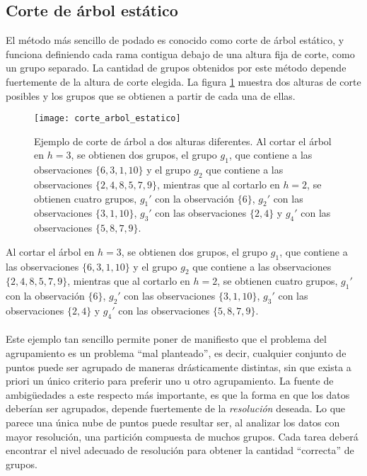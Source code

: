 \subsection{Corte de árbol estático}
El método más sencillo de podado es conocido como corte de árbol estático, y funciona definiendo cada rama contigua debajo de una altura fija de corte, como un grupo separado. La cantidad de grupos obtenidos por este método depende fuertemente de la altura de  corte elegida. La figura \ref{fig:corte_arbol_estatico} muestra dos alturas de corte posibles y los grupos que se obtienen a partir de cada una de ellas.
\begin{figure}[h]
    \centering
    \texttt{[image: corte\_arbol\_estatico]}
    \caption{Ejemplo de corte de árbol a dos alturas diferentes. Al cortar el árbol en $h=3$, se obtienen dos grupos, el grupo $g_1$, que contiene a las observaciones $\{6, 3, 1, 10\}$ y el grupo $g_2$ que contiene a las observaciones $\{2, 4, 8, 5, 7, 9\}$, mientras que al cortarlo en $h=2$, se obtienen cuatro grupos, $g_1'$ con la observación $\{6\}$, $g_2'$ con las observaciones $\{3, 1, 10\}$, $g_3'$ con las observaciones $\{2, 4\}$ y $g_4'$ con las observaciones $\{5, 8, 7, 9\}$.}
    \label{fig:corte_arbol_estatico}
\end{figure}
Al cortar el árbol en $h=3$, se obtienen dos grupos, el grupo $g_1$, que contiene a las observaciones $\{6, 3, 1, 10\}$ y el grupo $g_2$ que contiene a las observaciones $\{2, 4, 8, 5, 7, 9\}$, mientras que al cortarlo en $h=2$, se obtienen cuatro grupos, $g_1'$ con la observación $\{6\}$, $g_2'$ con las observaciones $\{3, 1, 10\}$, $g_3'$ con las observaciones $\{2, 4\}$ y $g_4'$ con las observaciones $\{5, 8, 7, 9\}$.\\\\
Este ejemplo tan sencillo permite poner de manifiesto que el problema del agrupamiento es un problema ``mal planteado'', es decir, cualquier conjunto de puntos puede ser agrupado de maneras drásticamente distintas, sin que exista a priori un único criterio para preferir uno u otro agrupamiento. La fuente de ambigüedades a este respecto más importante, es que la forma en que los datos deberían ser agrupados, depende fuertemente de la \textit{resolución} deseada. Lo que parece una única nube de puntos puede resultar ser, al analizar los datos con mayor resolución, una partición compuesta de muchos grupos. Cada tarea deberá encontrar el nivel adecuado de resolución para obtener la cantidad ``correcta'' de grupos.\cite{Domany1999}\cite{Langfelder2008}
